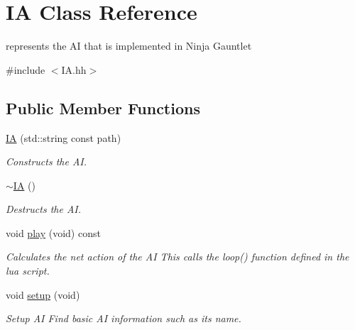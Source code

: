 \hypertarget{classIA}{}\section{IA Class Reference}
\label{classIA}


represents the AI that is implemented in Ninja Gauntlet  




{\ttfamily \#include $<$I\+A.\+hh$>$}

\subsection*{Public Member Functions}
\begin{DoxyCompactItemize}
\item 
\hyperlink{classIA_a5ec5e30441ce9163caf40cbb763c18df}{IA} (std\+::string const path)
\begin{DoxyCompactList}\small\item\em Constructs the AI. \end{DoxyCompactList}\item 
\mbox{\label{classIA_a67d4dd285ae5169239348432bab9ad0e}} 
\hyperlink{classIA_a67d4dd285ae5169239348432bab9ad0e}{$\sim$\+IA} ()
\begin{DoxyCompactList}\small\item\em Destructs the AI. \end{DoxyCompactList}\item 
\mbox{\label{classIA_a81df51f46b3b30ff6bece457d094b3fc}} 
void \hyperlink{classIA_a81df51f46b3b30ff6bece457d094b3fc}{play} (void) const
\begin{DoxyCompactList}\small\item\em Calculates the net action of the AI This calls the loop() function defined in the lua script. \end{DoxyCompactList}\item 
\mbox{\label{classIA_af500668744c1eaa6345db6d062e463fc}} 
void \hyperlink{classIA_af500668744c1eaa6345db6d062e463fc}{setup} (void)
\begin{DoxyCompactList}\small\item\em Setup AI Find basic AI information such as its name. \end{DoxyCompactList}\end{DoxyCompactItemize}
